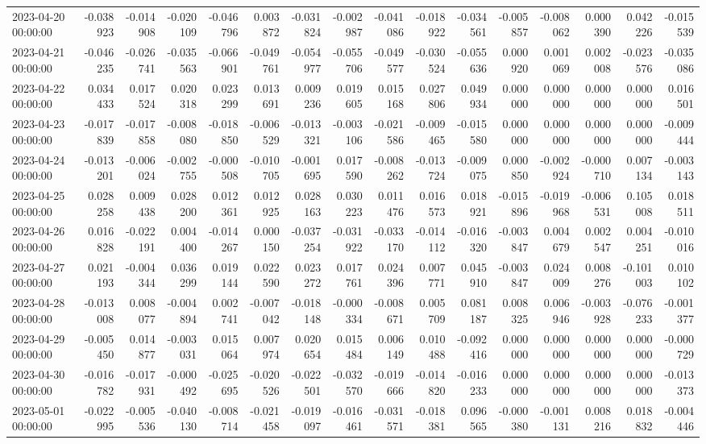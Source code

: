 \begin{tabular}{lrrrrrrrrrrrrrrr}
2023-04-20 00:00:00 & -0.038923 & -0.014908 & -0.020109 & -0.046796 & 0.003872 & -0.031824 & -0.002987 & -0.041086 & -0.018922 & -0.034561 & -0.005857 & -0.008062 & 0.000390 & 0.042226 & -0.015539 \\
2023-04-21 00:00:00 & -0.046235 & -0.026741 & -0.035563 & -0.066901 & -0.049761 & -0.054977 & -0.055706 & -0.049577 & -0.030524 & -0.055636 & 0.000920 & 0.001069 & 0.002008 & -0.023576 & -0.035086 \\
2023-04-22 00:00:00 & 0.034433 & 0.017524 & 0.020318 & 0.023299 & 0.013691 & 0.009236 & 0.019605 & 0.015168 & 0.027806 & 0.049934 & 0.000000 & 0.000000 & 0.000000 & 0.000000 & 0.016501 \\
2023-04-23 00:00:00 & -0.017839 & -0.017858 & -0.008080 & -0.018850 & -0.006529 & -0.013321 & -0.003106 & -0.021586 & -0.009465 & -0.015580 & 0.000000 & 0.000000 & 0.000000 & 0.000000 & -0.009444 \\
2023-04-24 00:00:00 & -0.013201 & -0.006024 & -0.002755 & -0.000508 & -0.010705 & -0.001695 & 0.017590 & -0.008262 & -0.013724 & -0.009075 & 0.000850 & -0.002924 & -0.000710 & 0.007134 & -0.003143 \\
2023-04-25 00:00:00 & 0.028258 & 0.009438 & 0.028200 & 0.012361 & 0.012925 & 0.028163 & 0.030223 & 0.011476 & 0.016573 & 0.018921 & -0.015896 & -0.019968 & -0.006531 & 0.105008 & 0.018511 \\
2023-04-26 00:00:00 & 0.016828 & -0.022191 & 0.004400 & -0.014267 & 0.000150 & -0.037254 & -0.031922 & -0.033170 & -0.014112 & -0.016320 & -0.003847 & 0.004679 & 0.002547 & 0.004251 & -0.010016 \\
2023-04-27 00:00:00 & 0.021193 & -0.004344 & 0.036299 & 0.019144 & 0.022590 & 0.023272 & 0.017761 & 0.024396 & 0.007771 & 0.045910 & -0.003847 & 0.024009 & 0.008276 & -0.101003 & 0.010102 \\
2023-04-28 00:00:00 & -0.013008 & 0.008077 & -0.004894 & 0.002741 & -0.007042 & -0.018148 & -0.000334 & -0.008671 & 0.005709 & 0.081187 & 0.008325 & 0.006946 & -0.003928 & -0.076233 & -0.001377 \\
2023-04-29 00:00:00 & -0.005450 & 0.014877 & -0.003031 & 0.015064 & 0.007974 & 0.020654 & 0.015484 & 0.006149 & 0.010488 & -0.092416 & 0.000000 & 0.000000 & 0.000000 & 0.000000 & -0.000729 \\
2023-04-30 00:00:00 & -0.016782 & -0.017931 & -0.000492 & -0.025695 & -0.020526 & -0.022501 & -0.032570 & -0.019666 & -0.014820 & -0.016233 & 0.000000 & 0.000000 & 0.000000 & 0.000000 & -0.013373 \\
2023-05-01 00:00:00 & -0.022995 & -0.005536 & -0.040130 & -0.008714 & -0.021458 & -0.019097 & -0.016461 & -0.031571 & -0.018381 & 0.096565 & -0.000380 & -0.001131 & 0.008216 & 0.018832 & -0.004446 \\

\end{tabular}

